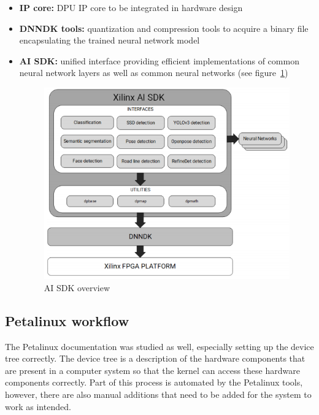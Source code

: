 \begin{itemize}
	\item \textbf{\ac{IP} core:} \ac{DPU} \ac{IP} core to be integrated in hardware design
	\item \textbf{\ac{DNNDK} tools:} quantization and compression tools to acquire a binary file encapsulating the trained neural network model
	\item \textbf{\ac{AI} \ac{SDK}:} unified interface providing efficient implementations of common neural network layers as well as common neural networks (see figure~\ref{fig:ai_sdk})
	\begin{figure}[!htb]
		\centering
			\includegraphics[width=\textwidth]{bilder/ai_sdk.png}
			\caption{\acs{AI} \acs{SDK} overview \cite{ai_sdk}}
			\label{fig:ai_sdk}
	\end{figure}
\end{itemize}
\subsection{Petalinux workflow}
The Petalinux documentation was studied as well, especially setting up the device tree correctly. The device tree is a description of the hardware components that are present in a computer system so that the kernel can access these hardware components correctly. Part of this process is automated by the Petalinux tools, however, there are also manual additions that need to be added for the system to work as intended.
